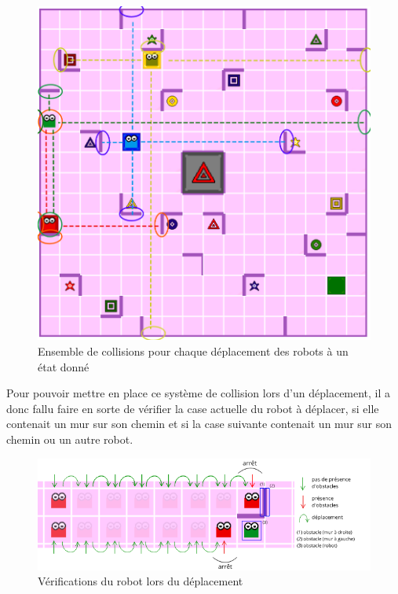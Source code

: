 \documentclass[a4paper, 12pt]{article}
\begin{document}
        
         \begin{figure}[H]
            \centering
            \includegraphics[scale=0.25]{images/collision.png}
            \caption{Ensemble de collisions pour chaque déplacement des robots à un état donné}
        \end{figure}
        
        Pour pouvoir mettre en place ce système de collision lors d'un déplacement, il a donc fallu faire en sorte de vérifier la case actuelle du robot à déplacer, si elle contenait un mur sur son chemin et si la case suivante contenait un mur sur son chemin ou un autre robot.
        
        \begin{figure}[H]
            \centering
            \includegraphics[scale=0.7]{images/deplacements.png}
            \caption{Vérifications du robot lors du déplacement}
        \end{figure}
        
\end{document}
